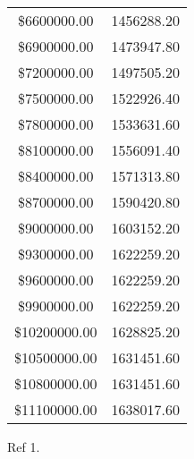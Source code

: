 \documentclass{article}
\begin{document}
\begin{table}[h!]
\begin{tabular}{cc}
\$6600000.00 & 1456288.20\\
\$6900000.00 & 1473947.80\\
\$7200000.00 & 1497505.20\\
\$7500000.00 & 1522926.40\\
\$7800000.00 & 1533631.60\\
\$8100000.00 & 1556091.40\\
\$8400000.00 & 1571313.80\\
\$8700000.00 & 1590420.80\\
\$9000000.00 & 1603152.20\\
\$9300000.00 & 1622259.20\\
\$9600000.00 & 1622259.20\\
\$9900000.00 & 1622259.20\\
\$10200000.00 & 1628825.20\\
\$10500000.00 & 1631451.60\\
\$10800000.00 & 1631451.60\\
\$11100000.00 & 1638017.60\\
\bottomrule
\end{tabular}
\end{table}

\newpage

\begin{thebibliography}{9}
\item Ref 1.
\end{thebibliography}
\end{document}
